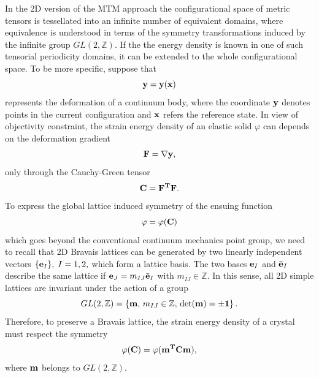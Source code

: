 \documentclass[aps,
superscriptaddress,notitlepage]{revtex4-1}
\def\phi{\varphi}
\begin{document}
In the 2D version of the MTM approach the configurational space of metric tensors is tessellated into an infinite number of equivalent domains, where equivalence is understood in terms of the symmetry transformations induced by   the infinite group $GL(2, \mathbb{Z})$.  If the the energy density  is known in one of such tensorial periodicity domains, it can be extended to the whole configurational space.   To be more specific,  suppose that  
\begin{equation}
\bf y = \bf y( \bf x)
\end{equation}
 represents the deformation of a continuum body, where the coordinate  $\bf y$ denotes points in the current configuration and $\bf x$ refers the reference state. In view of objectivity constraint, the strain energy density of an elastic solid  $\phi$
 can  depends on the deformation gradient
  \begin{equation}
 \bf F = \nabla \bf y,
 \end{equation}
only through the Cauchy-Green tensor 
\begin{equation}
 \bf C = \bf F^{T}\bf F.
 \end{equation}
   To express the global lattice induced symmetry of the ensuing function  
   \begin{equation}
   \phi= \phi(\bf C)
   \end{equation}
    which goes beyond the conventional continuum mechanics point group,  we need to  recall that 2D Bravais lattices can be generated by two linearly independent vectors $\lbrace {\bf e}_I\rbrace,\;I=1,2,$ which form a lattice basis.  The two bases ${\bf e}_I$ and ${\bar{\bf e}}_I$ describe the same lattice if 
 $ {\bf {e}}_J = m_{IJ} \bar{\bf e}_I$ with $ { m}_{IJ} \in {\mathbb Z}$. In this sense, all 2D simple lattices are invariant under the action of a group 
 \begin{equation}
 GL(2,\mathbb{Z}) = \left\{{\bf m},\, m_{IJ}\in{\mathbb Z},\, \det(\bf m)=\pm1 \right\} .
 \end{equation}
Therefore,  to preserve a Bravais lattice, the strain energy density of a crystal must respect the symmetry  \begin{equation}
 \phi(\bf C) = \phi(\bf m^T \bf C \bf m),
 \end{equation}
  where $\bf m$ belongs to $GL(2, \mathbb{Z})$. 
  
\end{document}
